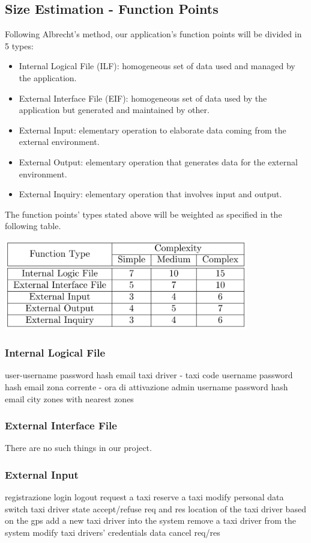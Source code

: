\documentclass{article}
\begin{document}
\subsection{Size Estimation - Function Points}
Following Albrecht's method, our application's function points
will be divided in 5 types:
\begin{itemize}
	\item Internal Logical File (ILF): homogeneous set of data used
	and managed by the application.
	\item External Interface File (EIF): homogeneous set of data 
	used by the application but generated and maintained by other.
	\item External Input: elementary operation to elaborate data
	coming from the external environment.
	\item External Output: elementary operation that generates data
	for the external environment.
	\item External Inquiry: elementary operation that involves
	input and output.
\end{itemize}
The function points' types stated above will be weighted as 
specified in the following table.
\begin{center}
	\includegraphics[width = 0.8\textwidth]{FP}
\end{center}
\subsubsection{Internal Logical File}
user-username password hash email
taxi driver - taxi code username password hash email zona corrente - ora di attivazione
admin username password hash email
city zones with nearest zones
\subsubsection{External Interface File}
There are no such things in our project.
\subsubsection{External Input}
registrazione
login
logout
request a taxi
reserve a taxi
modify personal data
switch taxi driver state
accept/refuse req and res
location of the taxi driver based on the gps
add a new taxi driver into the system
remove a taxi driver from the system
modify taxi drivers' credentials data
cancel req/res
\end{document}
